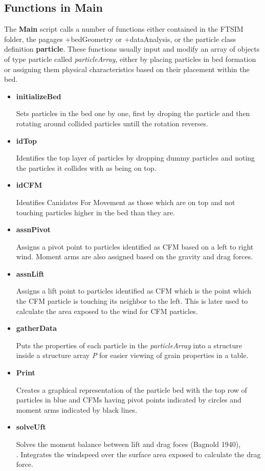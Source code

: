 \documentclass{article}
\begin{document}
\subsection*{Functions in Main}
	The \textbf{Main} script calls a number of functions either contained in the FTSIM folder, the pagages +bedGeometry or +dataAnalysis, or the particle class definition \textbf{particle}. These functions usually input and modify an array of objects of type particle called \textit{particleArray}, either by placing particles in bed formation or assigning them physical characteristics based on their placement within the bed.
\begin{itemize}
	\item \textbf{initializeBed}
	
	Sets particles in the bed one by one, first by droping the particle and then rotating around collided particles untill the rotation reverses.
	\item \textbf{idTop}
	
	Identifies the top layer of particles by dropping dummy particles and noting the particles it collides with as being on top.
	\item \textbf{idCFM}
	
	Identifies Canidates For Movement as those which are on top and not touching particles higher in the bed than they are.
	\item \textbf{assnPivot}
	
	Assigns a pivot point to particles identified as CFM based on a left to right wind. Moment arms are also assigned based on the gravity and drag forces.
	\item \textbf{assnLift}
	
	Assigns a lift point to particles identified as CFM which is the point which the CFM particle is touching its neighbor to the left. This is later used to calculate the area exposed to the wind for CFM particles.
	\item \textbf{gatherData}
	
	Puts the properties of each particle in the \textit{particleArray} into a structure inside a structure array \textit{P} for easier viewing of grain properties in a table.
	\item \textbf{Print}
	
	Creates a graphical representation of the particle bed with the top row of particles in blue and CFMs having pivot points indicated by circles and moment arms indicated by black lines.
	
	\item \textbf{solveUft}
	
	Solves the moment balance between lift and drag foces (Bagnold 1940),
	\begin{equation}
	
    \end{equation}. Integrates the windspeed over the surface area exposed to calculate the drag force. 
	 
\end{itemize}
\end{document}
